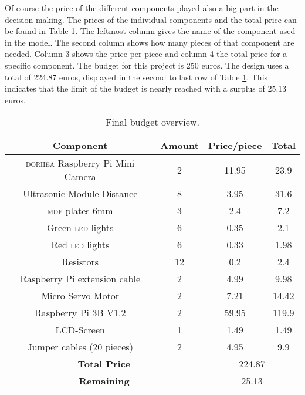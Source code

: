 Of course the price of the different components played also a big part in the decision making. The prices of the individual components and the total price can be found in Table \ref{tab:budget}. The leftmost column gives the name of the component used in the
model. The second column shows how many pieces of that component are needed. Column 3 shows the price per piece and column 4 the total price for a specific component.
The budget for this project is 250 euros. The design uses a total of 224.87 euros, displayed in the second to last row of Table \ref{tab:budget}. This indicates that the limit of the budget is nearly reached with a surplus of
25.13 euros. \newline


\begin{table}[htp]
    \centering
    \caption{Final budget overview.}
\begin{tabular}{|c|c|c|c|}
	\hline
	\textbf{Component} & \textbf{Amount} & \textbf{Price/piece} & \textbf{Total} \\
	\hline
	\textsc{dorhea} Raspberry Pi Mini Camera & 2 & 11.95 & 23.9 \\
	\hline
	Ultrasonic Module Distance & 8 & 3.95 & 31.6 \\
	\hline
	\textsc{mdf} plates 6mm & 3 & 2.4 & 7.2 \\
	\hline
	Green \textsc{led} lights & 6 & 0.35 & 2.1 \\
	\hline
	Red \textsc{led} lights & 6 & 0.33 & 1.98 \\
	\hline
	Resistors & 12 & 0.2 & 2.4 \\
	\hline
	Raspberry Pi extension cable & 2 & 4.99 & 9.98 \\
	\hline
	Micro Servo Motor & 2 & 7.21 & 14.42 \\
	\hline
    Raspberry Pi 3B V1.2 & 2 & 59.95 & 119.9 \\
    \hline
    LCD-Screen & 1 & 1.49 & 1.49 \\
    \hline
    Jumper cables (20 pieces) & 2 & 4.95 & 9.9 \\
    \hline
	\multicolumn{2}{|c|}{\textbf{Total Price}} & \multicolumn{2}{c|}{224.87} \\
	\hline
	\multicolumn{2}{|c|}{\textbf{Remaining}} & \multicolumn{2}{c|}{25.13} \\

	\hline
\end{tabular}
        
    \label{tab:budget}
\end{table}
